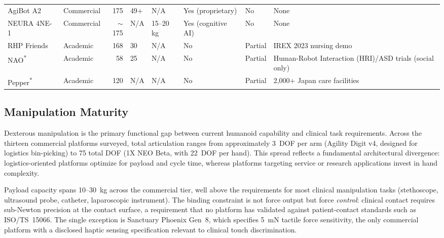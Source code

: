 \documentclass[acmsmall]{acmart}
\begin{document}
\begin{table}[t]
{\begin{tabular}{@{}llrlllll@{}}
    AgiBot A2~\cite{agibot2025a2}        & Commercial & 175 & 49+            & N/A        & Yes (proprietary)     & No      & None \\
    NEURA 4NE-1~\cite{neura2025_4ne1}      & Commercial & $\sim$175 & N/A      & 15--20\,kg & Yes (cognitive AI)   & No      & None \\
    RHP Friends      & Academic   & 168 & 30             & N/A        & No                    & Partial & IREX 2023 nursing demo~\cite{benallegue2025rhp} \\
    NAO\textsuperscript{*} & Academic & 58 & 25         & N/A   & No                    & Partial & Human-Robot Interaction (HRI)/ASD trials (social only) \\
    Pepper\textsuperscript{*} & Academic & 120 & N/A   & N/A        & No                    & Partial & 2,000+ Japan care facilities \\
    \bottomrule
  \end{tabular}%
  }
\end{table}

\subsection{Manipulation Maturity}
\label{sec:manipmaturity}

Dexterous manipulation is the primary functional gap between current humanoid
capability and clinical task requirements. Across the thirteen commercial platforms
surveyed, total articulation ranges from approximately 3~DOF per arm (Agility
Digit v4, designed for logistics bin-picking) to 75 total DOF (1X NEO Beta, with
22~DOF per hand). This spread reflects a fundamental architectural divergence:
logistics-oriented platforms optimize for payload and cycle time, whereas
platforms targeting service or research applications invest in hand complexity.

Payload capacity spans 10--30~kg across the commercial tier, well above the
requirements for most clinical manipulation tasks (stethoscope, ultrasound probe,
catheter, laparoscopic instrument). The binding constraint is not force output
but force \emph{control}: clinical contact requires sub-Newton precision at the
contact surface, a requirement that no platform has validated against patient-contact
standards such as ISO/TS~15066. The single exception is Sanctuary Phoenix Gen~8,
which specifies 5~mN tactile force sensitivity, the only commercial platform with
a disclosed haptic sensing specification relevant to clinical touch discrimination.
\end{document}
